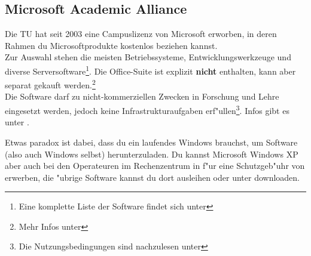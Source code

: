 \subsection{Microsoft Academic Alliance}
\label{msdnaa}
Die TU hat seit 2003 eine
Campuslizenz
von Microsoft erworben, in deren Rahmen du Microsoftprodukte kostenlos
beziehen kannst.\\
Zur Auswahl stehen die meisten Betriebssysteme, Entwicklungswerkzeuge und
diverse Serversoftware\footnote{\sloppy Eine komplette Liste der Software
findet sich unter }.
Die Office-Suite ist explizit \textbf{nicht} enthalten, kann aber separat
gekauft werden.\footnote{Mehr Infos unter
}\\
Die Software darf zu nicht-kommerziellen Zwecken in Forschung und Lehre
eingesetzt werden, jedoch keine Infrastrukturaufgaben
erf"ullen\footnote{Die Nutzungsbedingungen sind nachzulesen unter
}.
Infos gibt es unter
.


Etwas paradox ist dabei, dass du ein laufendes Windows brauchst, um Software 
(also auch Windows selbst) herunterzuladen. Du kannst Microsoft Windows XP 
aber auch bei den Operateuren im Rechenzentrum in 
f"ur eine Schutzgeb"uhr von  erwerben, die "ubrige Software kannst du
dort ausleihen oder unter
downloaden.